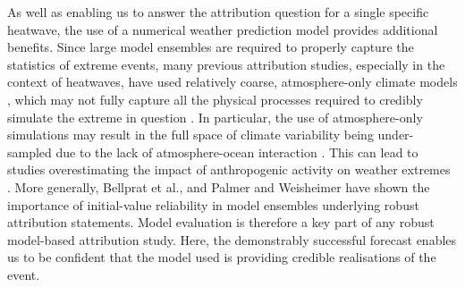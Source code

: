     As well as enabling us to answer the attribution question for a single specific heatwave, the use of a numerical weather prediction model provides additional benefits. Since large model ensembles are required to properly capture the statistics of extreme events, many previous attribution studies, especially in the context of heatwaves, have used relatively coarse, atmosphere-only climate models \citep{massey_weatherhome-development_2015,ciavarella_upgrade_2018,christidis_new_2013}, which may not fully capture all the physical processes required to credibly simulate the extreme in question \citep{sillmann_understanding_2017}. In particular, the use of atmosphere-only simulations may result in the full space of climate variability being under-sampled due to the lack of atmosphere-ocean interaction \citep{fischer_biased_2018}. This can lead to studies overestimating the impact of anthropogenic activity on weather extremes \citep{leach_anthropogenic_2020,bellprat_attribution_2016}. More generally, Bellprat et al., and Palmer and Weisheimer \citep{bellprat_towards_2019,palmer_simple_2018} have shown the importance of initial-value reliability in model ensembles underlying robust attribution statements. Model evaluation is therefore a key part of any robust model-based attribution study. Here, the demonstrably successful forecast enables us to be confident that the model used is providing credible realisations of the event.

